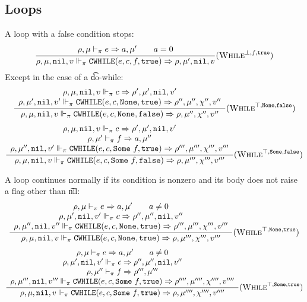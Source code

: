 \subsection{Loops}
A loop with a false condition stops:
\[\dfrac{\begin{array}{c}
    \rho,\mu \vdash_\pi e \Rightarrow a,\mu' \qquad a = 0 \\
\end{array}}{\rho,\mu,\texttt{nil},v \Vdash_\pi \texttt{CWHILE}(e, c, f, \texttt{true}) \Rightarrow \rho,\mu',\texttt{nil},v} (\textsc{While}^{\bot,f,\texttt{true}})\]
Except in the case of a \t{do-while}:
\[\dfrac{\begin{array}{c}
    \rho,\mu,\texttt{nil},v \Vdash_\pi c \Rightarrow \rho',\mu',\texttt{nil},v' \\
    \rho,\mu',\texttt{nil},v' \Vdash_\pi \texttt{CWHILE}(e, c, \texttt{None}, \texttt{true}) \Rightarrow \rho'',\mu'',\chi'',v''
\end{array}}{\rho,\mu,\texttt{nil},v \Vdash_\pi \texttt{CWHILE}(e, c, \texttt{None}, \texttt{false}) \Rightarrow \rho,\mu'',\chi'',v''}(\textsc{While}^{\top,\texttt{None},\texttt{false}})\]
\[\dfrac{\begin{array}{c}
    \rho,\mu,\texttt{nil},v \Vdash_\pi c \Rightarrow \rho',\mu',\texttt{nil},v' \\
    \rho,\mu' \vdash_\pi f \Rightarrow a,\mu'' \\
    \rho,\mu'',\texttt{nil},v' \Vdash_\pi \texttt{CWHILE}(e, c, \texttt{Some}\ f, \texttt{true}) \Rightarrow \rho''',\mu''',\chi''',v'''
\end{array}}{\rho,\mu,\texttt{nil},v \Vdash_\pi \texttt{CWHILE}(e, c, \texttt{Some}\ f, \texttt{false}) \Rightarrow \rho,\mu''',\chi''',v'''}(\textsc{While}^{\top,\texttt{Some},\texttt{false}})\]


A loop continues normally if its condition is nonzero and its body does not raise a flag other than \t{nil}:
\[\dfrac{\begin{array}{c}
    \rho,\mu \vdash_\pi e \Rightarrow a,\mu' \qquad a \ne 0 \\
    \rho,\mu',\texttt{nil},v' \Vdash_\pi c \Rightarrow \rho'',\mu'',\texttt{nil},v'' \\
    \rho,\mu'',\texttt{nil},v'' \Vdash_\pi \texttt{CWHILE}(e, c, \texttt{None}, \texttt{true}) \Rightarrow \rho''',\mu''',\chi''',v'''
\end{array}}{\rho,\mu,\texttt{nil},v \Vdash_\pi \texttt{CWHILE}(e, c, \texttt{None}, \texttt{true}) \Rightarrow \rho,\mu''',\chi''',v'''}(\textsc{While}^{\top,\texttt{None},\texttt{true}})\]
\[\dfrac{\begin{array}{c}
    \rho,\mu \vdash_\pi e \Rightarrow a,\mu' \qquad a \ne 0 \\
    \rho,\mu',\texttt{nil},v' \Vdash_\pi c \Rightarrow \rho'',\mu'',\texttt{nil},v'' \\
    \rho,\mu'' \vdash_\pi f \Rightarrow \rho''',\mu''' \\
    \rho,\mu''',\texttt{nil},v''' \Vdash_\pi \texttt{CWHILE}(e, c, \texttt{Some}\ f, \texttt{true}) \Rightarrow \rho'''',\mu'''',\chi'''',v''''
\end{array}}{\rho,\mu,\texttt{nil},v \Vdash_\pi \texttt{CWHILE}(e, c, \texttt{Some}\ f, \texttt{true}) \Rightarrow \rho,\mu'''',\chi'''',v''''}(\textsc{While}^{\top,\texttt{Some},\texttt{true}})\]


